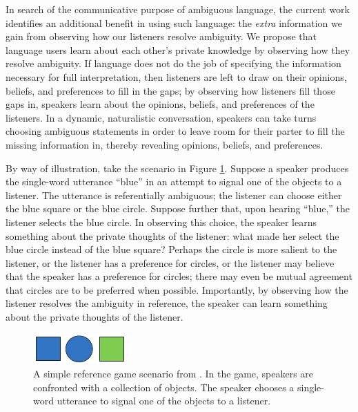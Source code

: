 \documentclass[10pt,a4paper]{article}
\begin{document}
In search of the communicative purpose of ambiguous language, the current work identifies an additional benefit in using such language: the \emph{extra} information we gain from observing how our listeners resolve ambiguity.
We propose that language users learn about each other's private knowledge by observing how they resolve ambiguity. If language does not do the job of specifying the information necessary for full interpretation, then listeners are left to draw on their opinions, beliefs, and preferences to fill in the gaps; by observing how listeners fill those gaps in, speakers learn about the opinions, beliefs, and preferences of the listeners.
In a dynamic, naturalistic conversation, speakers can take turns choosing ambiguous statements in order to leave room for their parter to fill the missing information in, thereby revealing opinions, beliefs, and preferences. 


By way of illustration, take the scenario in Figure \ref{FG-ref-game}.
Suppose a speaker produces the single-word utterance ``blue'' in an attempt to signal one of the objects to a listener. The utterance is referentially ambiguous; the listener can choose either the blue square or the blue circle. Suppose further that, upon hearing ``blue,'' the listener selects the blue circle. In observing this choice, the speaker learns something about the private thoughts of the listener: what made her select the blue circle instead of the blue square? Perhaps the circle is more salient to the listener, or the listener has a preference for circles, or the listener may believe that the speaker has a preference for circles; there may even be mutual agreement that circles are to be preferred when possible. Importantly, by observing how the listener resolves the ambiguity in reference, the speaker can learn something about the private thoughts of the listener. 

\begin{figure}
	\centering
	\includegraphics[width=.5\linewidth]{images/rsascene-eps-converted-to.pdf}
	\caption{A simple reference game scenario from \protect{}.
		In the game, speakers are confronted with a collection of objects. 
		The speaker chooses a single-word utterance to signal one of the objects to a listener.
		}
	\label{FG-ref-game}
\end{figure}
\end{document}
